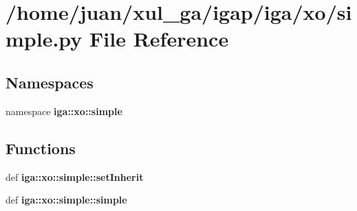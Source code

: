 \section{/home/juan/xul\_\-ga/igap/iga/xo/simple.py File Reference}
\label{xo_2simple_8py}
\subsection*{Namespaces}
\begin{CompactItemize}
\item 
namespace {\bf iga::xo::simple}
\end{CompactItemize}
\subsection*{Functions}
\begin{CompactItemize}
\item 
def {\bf iga::xo::simple::setInherit}
\item 
def {\bf iga::xo::simple::simple}
\end{CompactItemize}
